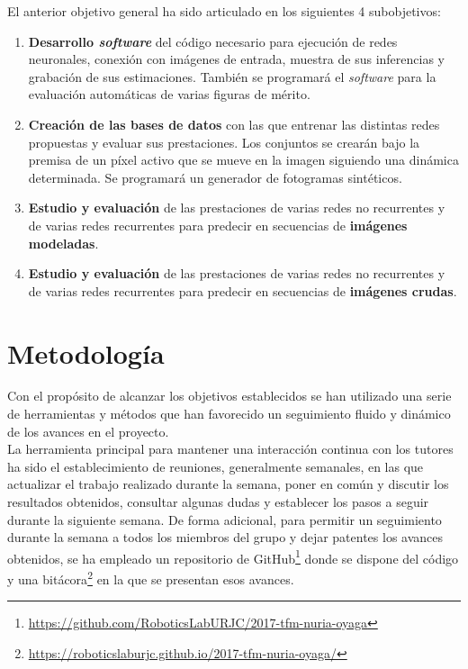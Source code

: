 El anterior objetivo general ha sido articulado en los siguientes 4 subobjetivos:
\begin{enumerate}
    \item \textbf{Desarrollo \textit{software}} del código necesario para ejecución de redes neuronales, conexión con imágenes de entrada, muestra de sus inferencias y grabación de sus estimaciones. También se programará el \textit{software} para la evaluación automáticas de varias figuras de mérito.
    \item \textbf{Creación de las bases de datos} con las que entrenar las distintas redes propuestas y  evaluar sus prestaciones. Los conjuntos se crearán bajo la premisa de un píxel activo que se mueve en la imagen siguiendo una dinámica determinada. Se programará un generador de fotogramas sintéticos.
    \item \textbf{Estudio y evaluación} de las prestaciones de varias redes no recurrentes y de varias redes recurrentes para predecir en secuencias de \textbf{imágenes modeladas}.
    \item \textbf\textbf{Estudio y evaluación} de las prestaciones de varias redes no recurrentes y de varias redes recurrentes para predecir en secuencias de \textbf{imágenes crudas}.
\end{enumerate}


\section{Metodología}

Con el propósito de alcanzar los objetivos establecidos se han utilizado una serie de herramientas y métodos que han favorecido un seguimiento fluido y dinámico de los avances en el proyecto.\\

La herramienta principal para mantener una interacción continua con los tutores ha sido el establecimiento de reuniones, generalmente semanales, en las que actualizar el trabajo realizado durante la semana, poner en común y discutir los resultados obtenidos, consultar algunas dudas y establecer los pasos a seguir durante la siguiente semana. De forma adicional, para permitir un seguimiento durante la semana a todos los miembros del grupo y dejar patentes los avances obtenidos, se ha empleado un repositorio de GitHub\footnote{\url{https://github.com/RoboticsLabURJC/2017-tfm-nuria-oyaga}} donde se dispone del código y una bitácora\footnote{\url{https://roboticslaburjc.github.io/2017-tfm-nuria-oyaga/}} en la que se presentan esos avances.\\


